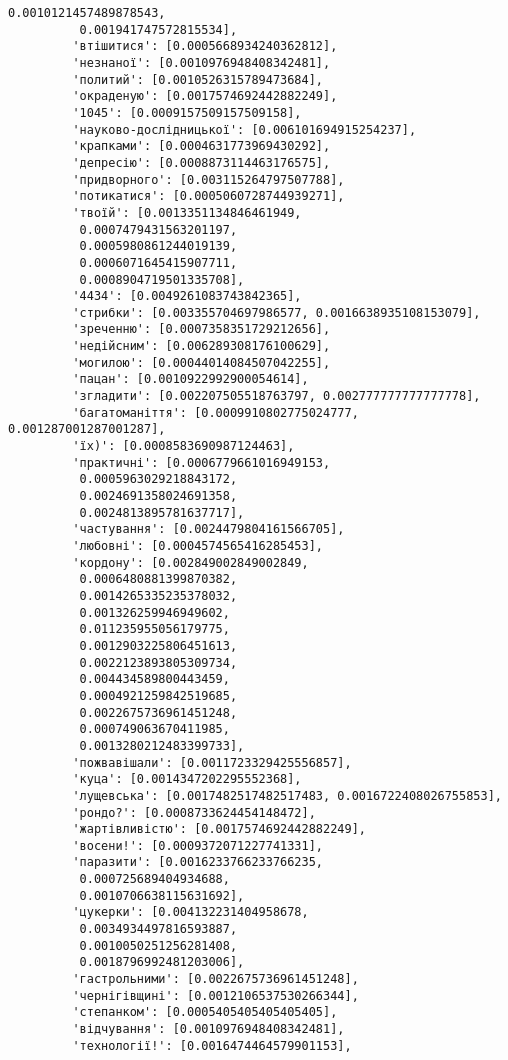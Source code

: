 \documentclass[11pt]{article}
\begin{document}
\begin{Verbatim}[commandchars=\\\{\}]
          0.0010121457489878543,
          0.001941747572815534],
         'втішитися': [0.0005668934240362812],
         'незнаної': [0.0010976948408342481],
         'политий': [0.0010526315789473684],
         'окраденую': [0.0017574692442882249],
         '1045': [0.0009157509157509158],
         'науково-дослідницької': [0.006101694915254237],
         'крапками': [0.0004631773969430292],
         'депресію': [0.0008873114463176575],
         'придворного': [0.003115264797507788],
         'потикатися': [0.0005060728744939271],
         'твоїй': [0.0013351134846461949,
          0.0007479431563201197,
          0.0005980861244019139,
          0.0006071645415907711,
          0.0008904719501335708],
         '4434': [0.0049261083743842365],
         'стрибки': [0.003355704697986577, 0.0016638935108153079],
         'зреченню': [0.0007358351729212656],
         'недійсним': [0.006289308176100629],
         'могилою': [0.00044014084507042255],
         'пацан': [0.0010922992900054614],
         'згладити': [0.002207505518763797, 0.002777777777777778],
         'багатоманіття': [0.0009910802775024777, 0.001287001287001287],
         'їх)': [0.0008583690987124463],
         'практичні': [0.0006779661016949153,
          0.0005963029218843172,
          0.0024691358024691358,
          0.0024813895781637717],
         'частування': [0.0024479804161566705],
         'любовні': [0.0004574565416285453],
         'кордону': [0.002849002849002849,
          0.0006480881399870382,
          0.0014265335235378032,
          0.001326259946949602,
          0.011235955056179775,
          0.0012903225806451613,
          0.0022123893805309734,
          0.004434589800443459,
          0.0004921259842519685,
          0.0022675736961451248,
          0.000749063670411985,
          0.0013280212483399733],
         'пожвавішали': [0.0011723329425556857],
         'куца': [0.0014347202295552368],
         'лущевська': [0.0017482517482517483, 0.0016722408026755853],
         'рондо?': [0.0008733624454148472],
         'жартівливістю': [0.0017574692442882249],
         'восени!': [0.0009372071227741331],
         'паразити': [0.0016233766233766235,
          0.000725689404934688,
          0.0010706638115631692],
         'цукерки': [0.004132231404958678,
          0.0034934497816593887,
          0.0010050251256281408,
          0.0018796992481203006],
         'гастрольними': [0.0022675736961451248],
         'чернігівщині': [0.0012106537530266344],
         'степанком': [0.0005405405405405405],
         'відчування': [0.0010976948408342481],
         'технології!': [0.0016474464579901153],

\end{Verbatim}
\end{document}
